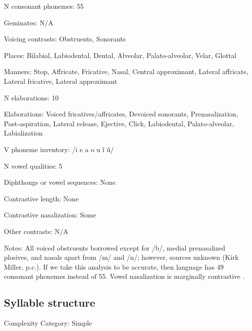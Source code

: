 {\begin{appendixdesc}
\item[N consonant phonemes:] 55

\item[Geminates:] N/A

\item[Voicing contrasts:] Obstruents, Sonorants

\item[Places:] Bilabial, Labiodental, Dental, Alveolar, Palato-alveolar, Velar, Glottal

\item[Manners:] Stop, Affricate, Fricative, Nasal, Central approximant, Lateral affricate, Lateral fricative, Lateral approximant

\item[N elaborations:] 10

\item[Elaborations:] Voiced fricatives/affricates, Devoiced sonorants, Prenasalization, Post-aspiration, Lateral release, Ejective, Click, Labiodental, Palato-alveolar, Labialization

\item[V phoneme inventory:] /i e a o u ĩ ũ/

\item[N vowel qualities:] 5

\item[Diphthongs or vowel sequences:] None

\item[Contrastive length:] None

\item[Contrastive nasalization:] Some

\item[Other contrasts:] N/A

\item[Notes:] All voiced obstruents borrowed except for /b/, medial prenasalized plosives, and nasals apart from /m/ and /n/; however, sources unknown (Kirk Miller, p.c.). If we take this analysis to be accurate, then language has 49 consonant phonemes instead of 55. Vowel nasalization is marginally contrastive \citep[38]{Sands2013}.
\end{appendixdesc}
\subsection*{Syllable structure}
\begin{appendixdesc}

\item[Complexity Category:] Simple


\end{appendixdesc}}
